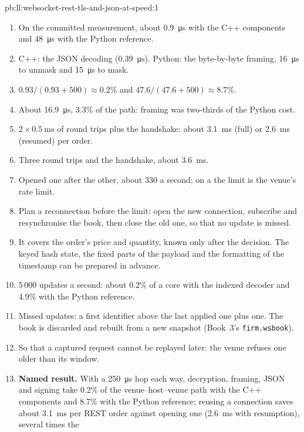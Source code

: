 \begin{solution}{pb:ll:websocket-rest-tls-and-json-at-speed:1}
\begin{enumerate}
\item On the committed measurement, about \qty{0.9}{\micro\second} with the C++ components and \qty{48}{\micro\second} with the
Python reference.
\item C++: the JSON decoding (\qty{0.39}{\micro\second}). Python: the byte-by-byte framing, \qty{16}{\micro\second} to unmask
and \qty{15}{\micro\second} to mask.
\item $0.93/(0.93 + 500) \approx 0.2\%$ and $47.6/(47.6 + 500) \approx 8.7\%$.
\item About \qty{16.9}{\micro\second}, $3.3\%$ of the path: framing was two-thirds of the Python cost.
\item $2 \times \qty{0.5}{\milli\second}$ of round trips plus the handshake: about \qty{3.1}{\milli\second} (full) or
\qty{2.6}{\milli\second} (resumed) per order.
\item Three round trips and the handshake, about \qty{3.6}{\milli\second}.
\item Opened one after the other, about 330 a second; on a  the limit is the venue's rate limit.
\item Plan a reconnection before the limit: open the new connection, subscribe and resynchronise the book, then close the old
one, so that no update is missed.
\item It covers the order's price and quantity, known only after the decision. The keyed hash state, the fixed parts of the
payload and the formatting of the timestamp can be prepared in advance.
\item 5\,000 updates a second: about 0.2\% of a core with the indexed decoder and 4.9\% with the Python reference.
\item Missed updates: a first identifier above the last applied one plus one. The book is discarded and rebuilt from a new
snapshot (Book~3's \texttt{firm.wsbook}).
\item So that a captured request cannot be replayed later: the venue refuses one older than its window.
\item \textbf{Named result.} With a \qty{250}{\micro\second} hop each way, decryption, framing, JSON and signing take 0.2\% of
the venue--host--venue path with the C++ components and 8.7\% with the Python reference; reusing a connection saves about
\qty{3.1}{\milli\second} per REST order against opening one (\qty{2.6}{\milli\second} with resumption), several times the

\end{enumerate}
\end{solution}
